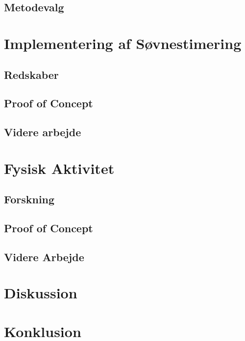 \section{Metodevalg}\label{sec:metodevalg}



\chapter{Implementering af Søvnestimering}

\section{Redskaber}\label{sec:redskaber}


\section{Proof of Concept}


\label{sec:verisoevn}
\section{Videre arbejde}\label{sec:videre-arbejde}








\chapter{Fysisk Aktivitet}

\section{Forskning}

\section{Proof of Concept}

\section{Videre Arbejde}\label{sec:videre-arbejde-fa}


\chapter{Diskussion}\label{chap:bigdisc}


\chapter{Konklusion}




\label{bib:mybiblio}

\appendix


